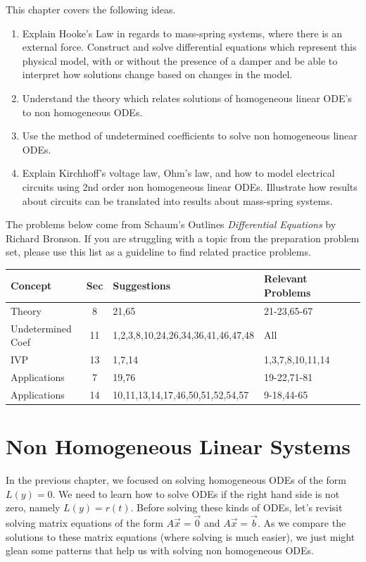 
\noindent This chapter covers the following ideas.

\begin{enumerate}
	\item Explain Hooke's Law in regards to mass-spring systems, where there is an external force. Construct and solve differential equations which represent this physical model, with or without the presence of a damper and be able to interpret how solutions change based on changes in the model. 
	\item Understand the theory which relates solutions of homogeneous linear ODE's to non homogeneous ODEs. 
	\item Use the method of undetermined coefficients  to solve non homogeneous linear ODEs.
	\item Explain Kirchhoff's voltage law, Ohm's law, and how to model electrical circuits using 2nd order non homogeneous linear ODEs.  Illustrate how results about circuits can be translated into results about mass-spring systems.
\end{enumerate}

The problems below come from Schaum's Outlines \textit{Differential Equations} by Richard Bronson. If you are struggling with a topic from the preparation problem set, please use this list as a guideline to find related practice problems.

\begin{center}
\begin{tabular}{|l|c|l|l|l|l|}
\hline
Concept&Sec&Suggestions&Relevant Problems\\ \hline
Theory&8&21,65&21-23,65-67\\ \hline
Undetermined Coef&11&1,2,3,8,10,24,26,34,36,41,46,47,48&All\\ \hline
IVP&13&1,7,14&1,3,7,8,10,11,14\\ \hline
Applications&7&19,76&19-22,71-81\\ \hline
Applications&14&10,11,13,14,17,46,50,51,52,54,57&9-18,44-65\\ \hline
\end{tabular}
\end{center}

\section{Non Homogeneous Linear Systems}
In the previous chapter, we focused on solving homogeneous ODEs of the form $L(y) = 0$. We need to learn how to solve ODEs if the right hand side is not zero, namely $L(y) = r(t)$. Before solving these kinds of ODEs, let's revisit solving matrix equations of the form $A\vec x=\vec 0$ and $A\vec x = \vec b$.  As we compare the solutions to these matrix equations (where solving is much easier), we just might glean some patterns that help us with solving non homogeneous ODEs.


